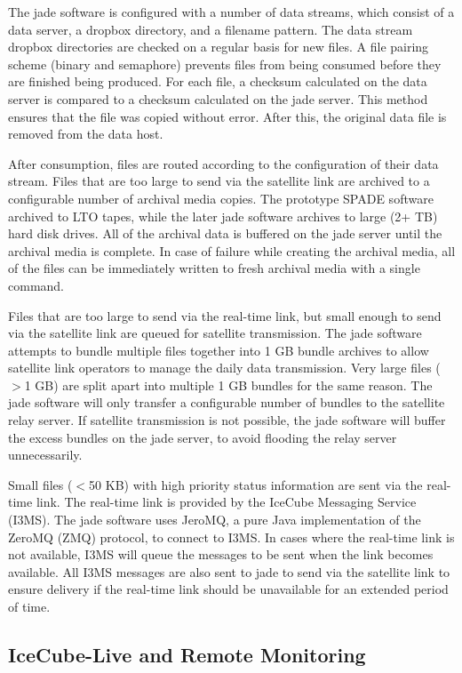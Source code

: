 The jade software is configured with a number of data streams, which consist of a data server, a dropbox directory, and a filename pattern.
The data stream dropbox directories are checked on a regular basis for new files. A file pairing scheme (binary and semaphore) prevents files
from being consumed before they are finished being produced. For each file, a checksum calculated on the data server is compared to a checksum
calculated on the jade server. This method ensures that the file was copied without error. After this, the original data file is removed from the data host.

After consumption, files are routed according to the configuration of their data stream. Files that are too large to send via the satellite link are archived to
a configurable number of archival media copies. The prototype SPADE software archived to LTO tapes, while the later jade software archives to large (2+ TB) hard
disk drives. All of the archival data is buffered on the jade server until the archival media is complete. In case of failure while creating the archival media,
all of the files can be immediately written to fresh archival media with a single command.

Files that are too large to send via the real-time link, but small enough to send via the satellite link are queued for satellite transmission. The jade software
attempts to bundle multiple files together into 1 GB bundle archives to allow satellite link operators to manage the daily data transmission. Very large files
($>$1 GB) are split apart into multiple 1 GB bundles for the same reason. The jade software will only transfer a configurable number of bundles to the satellite
relay server. If satellite transmission is not possible, the jade software will buffer the excess bundles on the jade server, to avoid flooding the relay server
unnecessarily.


Small files ($<$50 KB) with high priority status information are sent via the real-time link. The real-time link is provided by the IceCube Messaging Service
(I3MS). The jade software uses JeroMQ, a pure Java implementation of the ZeroMQ (ZMQ) protocol, to connect to I3MS. In cases where the real-time link is not
available, I3MS will queue the messages to be sent when the link becomes available. All I3MS messages are also sent to jade to send via the satellite link to
ensure delivery if the real-time link should be unavailable for an extended period of time.

\subsection{\label{sec:online:icecubelive}IceCube-Live and Remote Monitoring}


